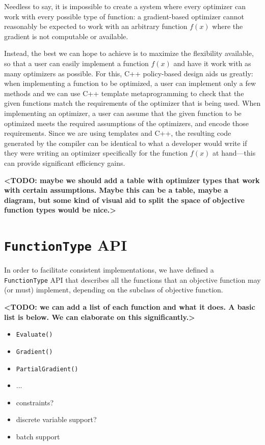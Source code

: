 \documentclass{article}
\begin{document}
Needless to say, it is impossible to create a system where every optimizer can
work with every possible type of function: a gradient-based optimizer cannot
reasonably be expected to work with an arbitrary function $f(x)$ where the
gradient is not computable or available.

Instead, the best we can hope to achieve is to maximize the flexibility
available, so that a user can easily implement a function $f(x)$ and have it
work with as many optimizers as possible.  For this, C++ policy-based design
aids us greatly: when implementing a function to be optimized, a user can
implement only a few methods and we can use C++ template metaprogramming to
check that the given functions match the requirements of the optimizer that is
being used.  When implementing an optimizer, a user can assume that the given
function to be optimized meets the required assumptions of the optimizers, and
encode those requirements.  Since we are using templates and C++, the resulting
code generated by the compiler can be identical to what a developer would write
if they were writing an optimizer specifically for the function $f(x)$ at
hand---this can provide significant efficiency gains.

{\bf <TODO: maybe we should add a table with optimizer types that work with
certain assumptions.  Maybe this can be a table, maybe a diagram, but some kind
of visual aid to split the space of objective function types would be nice.>}

\section{{\tt FunctionType} API}

In order to facilitate consistent implementations, we have defined a {\tt
FunctionType} API that describes all the functions that an objective function
may (or must) implement, depending on the subclass of objective function.

{\bf <TODO: we can add a list of each function and what it does.  A basic list
is below.  We can elaborate on this significantly.>}

\begin{itemize}
  \item {\tt Evaluate()}
  \item {\tt Gradient()}
  \item {\tt PartialGradient()} 
  \item ...
  \item constraints?
  \item discrete variable support?
  \item batch support
\end{itemize}
\end{document}
